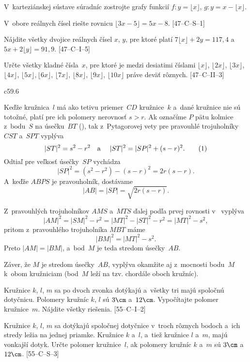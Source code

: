 {V~karteziánskej sústave súradníc zostrojte grafy funkcií
$f\colon y=\lfloor x\rfloor$, $g\colon y=x-\lfloor x\rfloor$.

\D
V~obore reálnych čísel riešte rovnicu $\lfloor 3x-5\rfloor=5x-8$. [47--C--S--1]

Nájdite všetky dvojice reálnych čísel $x$, $y$, pre ktoré platí
$7\lfloor x\rfloor+2y =117{,}4$ a~${5x+2\lfloor y\rfloor}=91{,}9$. [47--C--I--5]

Určte všetky kladné čísla~$x$, pre ktoré je medzi desiatimi číslami
$\lfloor x\rfloor$, $\lfloor 2x\rfloor$, $\lfloor 3x\rfloor$, $\lfloor 4x\rfloor$,
$\lfloor 5x\rfloor,\lfloor 6x\rfloor$, $\lfloor 7x\rfloor$, $\lfloor 8x\rfloor$,
$\lfloor 9x\rfloor$, $\lfloor 10x\rfloor$ práve deväť rôznych. [47--C--II--3]
}

{%
\epsplace c59.6 \hfil\Obr

Keďže kružnica~$l$ má ako tetivu priemer~$CD$ kružnice~$k$ a~dané kružnice nie sú totožné,
platí pre ich polomery nerovnosť $s>r$. Ak označíme $P$ pätu kolmice z~bodu~$S$ na
úsečku~$BT$ (\obr),
\inspicture{}
tak z~Pytagorovej vety pre pravouhlé trojuholníky $CST$ a~$SPT$ vyplýva
$$
|ST|^2=s^2-r^2 \quad\text a~\quad |ST|^2=|SP|^2+(s-r)^2.  \tag1
$$
Odtiaľ pre veľkosť úsečky~$SP$ vychádza
$$
|SP|^2=(s^2-r^2)-(s-r)^2=2r(s-r).
$$
A~keďže $ABPS$ je pravouholník, dostávame
$$
|AB|=|SP|= \sqrt{2r(s-r)}.
$$

Z~pravouhlých trojuholníkov $AMS$ a~$MTS$ ďalej podľa prvej rovnosti v~ vyplýva
$$
|AM|^2=|SM|^2-r^2=|MT|^2-|ST|^2-r^2=|MT|^2-s^2,
$$
pritom z~pravouhlého trojuholníka $M\!BT$ máme
$$
|BM|^2=|MT|^2-s^2.
$$
Preto $|AM|=|BM|$, a~bod~$M$ je teda stredom úsečky~$AB$.

\poznamka
Záver, že $M$ je stredom úsečky~$AB$, vyplýva okamžite aj
z~mocnosti bodu~$M$ k~obom kružniciam (bod~$M$ leží na tzv. chordále
oboch kružníc). 


Kružnice $k$, $l$, $m$ sa po dvoch zvonka dotýkajú a~všetky tri majú spoločnú dotyčnicu.
Polomery kružníc $k$, $l$ sú $3\cm$ a~$12\cm$. Vypočítajte polomer kružnice~$m$.
Nájdite všetky riešenia.
[55--C--I--2]

Kružnice $k$, $l$, $m$ sa dotýkajú spoločnej dotyčnice v~troch rôznych bodoch a~ich stredy ležia na jednej priamke. Kružnice $k$ a~$l$, a~tiež kružnice $l$ a~$m$, majú vonkajší dotyk. Určte polomer kružnice~$l$,
ak polomery kružníc $k$ a~$m$ sú $3\cm$ a~$12\cm$. [55--C--S--3]

}

